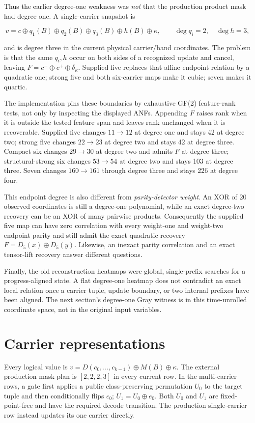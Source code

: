 \documentclass[11pt]{article}
\newcommand{\xor}{\oplus}
\begin{document}
Thus the earlier degree-one weakness was \emph{not} that the production
product mask had degree one.  A single-carrier snapshot is

\[
v=c\xor q_1(B)\xor q_2(B)\xor q_3(B)\xor h(B)\xor\kappa,
\qquad \deg q_i=2,\quad\deg h=3,
\]

and is degree three in the current physical carrier/band coordinates.  The
problem is that the same $q_i,h$ occur on both sides of a recognized update and
cancel, leaving $F=c^-\xor c^+\xor\delta_\kappa$.  Supplied five replaces that
affine endpoint relation by a quadratic one; strong five and both six-carrier
maps make it cubic; seven makes it quartic.

The implementation pins these boundaries by exhaustive GF(2) feature-rank
tests, not only by inspecting the displayed ANFs.  Appending $F$ raises rank
when it is outside the tested feature span and leaves rank unchanged when it is
recoverable.  Supplied five changes $11\to12$ at degree one and stays 42 at
degree two; strong five changes $22\to23$ at degree two and stays 42 at degree
three.  Compact six changes $29\to30$ at degree two and admits $F$ at degree
three; structural-strong six changes $53\to54$ at degree two and stays 103 at
degree three.  Seven changes $160\to161$ through degree three and stays 226 at
degree four.

This endpoint degree is also different from \emph{parity-detector weight}.  An
XOR of 20 observed coordinates is still a degree-one polynomial, while an exact
degree-two recovery can be an XOR of many pairwise products.  Consequently the
supplied five map can have zero correlation with every weight-one and
weight-two endpoint parity and still admit the exact quadratic recovery
$F=D_5(x)\xor D_5(y)$.  Likewise, an inexact parity correlation and an exact
tensor-lift recovery answer different questions.

Finally, the old reconstruction heatmaps were global, single-prefix searches
for a progress-aligned state.  A flat degree-one heatmap does not contradict an
exact local relation once a carrier tuple, update boundary, or two internal
prefixes have been aligned.  The next section's degree-one Gray witness is in
this time-unrolled coordinate space, not in the original input variables.

\section{Carrier representations}

Every logical value is $v=D(c_0,\ldots,c_{k-1})\xor M(B)\xor\kappa$.
The external production mask plan is $[2,2,2,3]$ in every current row.  In the
multi-carrier rows, a gate first applies a public class-preserving permutation
$U_0$ to the target tuple and then conditionally flips $c_0$;
$U_1=U_0\xor e_0$.  Both $U_0$ and $U_1$ are fixed-point-free and have the
required decode transition.  The production single-carrier row instead
updates its one carrier directly.
\end{document}
